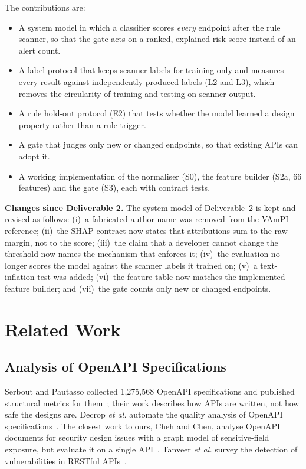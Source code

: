 \documentclass[conference]{IEEEtran}
\begin{document}
The contributions are:
\begin{itemize}
\item A system model in which a classifier scores \emph{every} endpoint after the rule scanner,
so that the gate acts on a ranked, explained risk score instead of an alert count.
\item A label protocol that keeps scanner labels for training only and measures every result
against independently produced labels (L2 and L3), which removes the circularity of training and testing on scanner output.
\item A rule hold-out protocol (E2) that tests whether the model learned a design property
rather than a rule trigger.
\item A gate that judges only new or changed endpoints, so that existing APIs can adopt it.
\item A working implementation of the normaliser (S0), the feature builder (S2a, 66 features)
and the gate (S3), each with contract tests.
\end{itemize}

\textbf{Changes since Deliverable 2.} The system model of Deliverable~2 is kept and revised
as follows: (i)~a fabricated author name was removed from the VAmPI reference; (ii)~the SHAP
contract now states that attributions sum to the raw margin, not to the score; (iii)~the claim
that a developer cannot change the threshold now names the mechanism that enforces it;
(iv)~the evaluation no longer scores the model against the scanner labels it trained on;
(v)~a text-inflation test was added; (vi)~the feature table now
matches the implemented feature builder; and (vii)~the gate counts only new or changed
endpoints.

\section{Related Work}
\subsection{Analysis of OpenAPI Specifications}
Serbout and Pautasso collected 1{,}275{,}568 OpenAPI specifications and published structural
metrics for them~\cite{apistic}; their work describes how APIs are written, not how safe the
designs are. Decrop \emph{et al.} automate the quality analysis of OpenAPI
specifications~\cite{oasquali}. The closest work to ours, Cheh and Chen, analyse OpenAPI
documents for security design issues with a graph model of sensitive-field exposure, but
evaluate it on a single API~\cite{cheh}. Tanveer \emph{et al.} survey the detection of
vulnerabilities in RESTful APIs~\cite{tanveer}.
\end{document}
